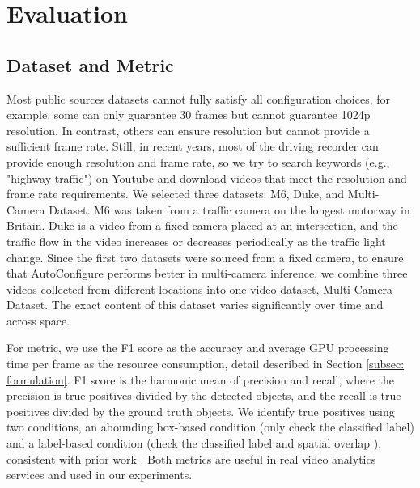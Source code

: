 \section{Evaluation}
\label{Section: experiment}

\subsection{Dataset and Metric}
\label{subsec: datasets}

Most public sources datasets cannot fully satisfy all configuration choices, for example, some can only guarantee 30 frames but cannot guarantee 1024p resolution. In contrast, others can ensure resolution but cannot provide a sufficient frame rate. Still, in recent years, most of the driving recorder can provide enough resolution and frame rate, so we try to search keywords (e.g., "highway traffic") on Youtube and download videos that meet the resolution and frame rate requirements. We selected three datasets: M6, Duke, and Multi-Camera Dataset. M6 was taken from a traffic camera on the longest motorway in Britain. Duke is a video from a fixed camera placed at an intersection, and the traffic flow in the video increases or decreases periodically as the traffic light change. Since the first two datasets were sourced from a fixed camera, to ensure that AutoConfigure performs better in multi-camera inference, we combine three videos collected from different locations into one video dataset, Multi-Camera Dataset. The exact content of this dataset varies significantly over time and across space.

For metric, we use the F1 score as the accuracy and average GPU processing time per frame as the resource consumption, detail described in Section \ref{subsec: formulation}. F1 score
is the harmonic mean of precision and recall, where the precision is true positives divided by the detected objects, and the recall is true positives divided by the ground truth objects. We identify true positives using two conditions, an abounding box-based condition (only check the classified label) and a label-based condition (check the classified label and spatial overlap \cite{overlap}), consistent with prior work \cite{jiang2018chameleon,noscope}. Both metrics are useful in real video analytics services and used in our experiments.

